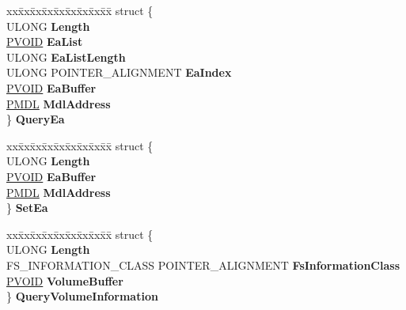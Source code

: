 \begin{DoxyCompactItemize}
\begin{tabbing}
\end{tabbing}\item 
\mbox{\label{union___f_l_t___p_a_r_a_m_e_t_e_r_s_ae252ba8d2def96937a3def56b1632234}} 
\begin{tabbing}
xx\=xx\=xx\=xx\=xx\=xx\=xx\=xx\=xx\=\kill
struct \{\\
\>ULONG {\bfseries Length}\\
\>\hyperlink{interfacevoid}{PVOID} {\bfseries EaList}\\
\>ULONG {\bfseries EaListLength}\\
\>ULONG POINTER\_ALIGNMENT {\bfseries EaIndex}\\
\>\hyperlink{interfacevoid}{PVOID} {\bfseries EaBuffer}\\
\>\hyperlink{interfacevoid}{PMDL} {\bfseries MdlAddress}\\
\} {\bfseries QueryEa}\\

\end{tabbing}\item 
\mbox{\label{union___f_l_t___p_a_r_a_m_e_t_e_r_s_a3ccc3ef0408aac60d2888bf48fdd0f56}} 
\begin{tabbing}
xx\=xx\=xx\=xx\=xx\=xx\=xx\=xx\=xx\=\kill
struct \{\\
\>ULONG {\bfseries Length}\\
\>\hyperlink{interfacevoid}{PVOID} {\bfseries EaBuffer}\\
\>\hyperlink{interfacevoid}{PMDL} {\bfseries MdlAddress}\\
\} {\bfseries SetEa}\\

\end{tabbing}\item 
\mbox{\label{union___f_l_t___p_a_r_a_m_e_t_e_r_s_a0d62d40a77ff2de7a5d1242fb4fc6d4d}} 
\begin{tabbing}
xx\=xx\=xx\=xx\=xx\=xx\=xx\=xx\=xx\=\kill
struct \{\\
\>ULONG {\bfseries Length}\\
\>FS\_INFORMATION\_CLASS POINTER\_ALIGNMENT {\bfseries FsInformationClass}\\
\>\hyperlink{interfacevoid}{PVOID} {\bfseries VolumeBuffer}\\
\} {\bfseries QueryVolumeInformation}\\


\end{tabbing}
\end{DoxyCompactItemize}
